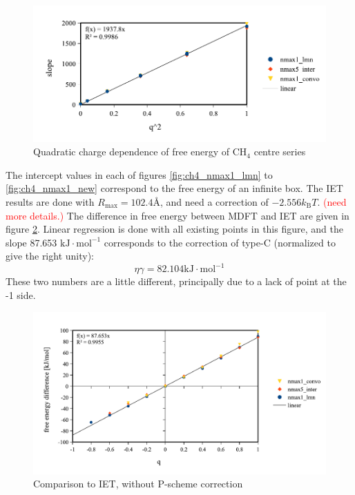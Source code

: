 \begin{figure}[H]
\begin{centering}
\includegraphics[bb=0bp 20bp 425bp 178bp,scale=0.6]{_figure/results/ch4_slope}
\par\end{centering}
\caption{Quadratic charge dependence of free energy of $\mathrm{C}\mathrm{H}_{4}$
centre series\label{fig:Quadratic-charge-dependence}}
\end{figure}
The intercept values in each of figures \ref{fig:ch4_nmax1_lmn} to
\ref{fig:ch4_nmax1_new} correspond to the free energy of an infinite
box. The \acs{IET} results are done with $R_{\max}=102.4\textrm{Å}$,
and need a correction of $-2.556k_{\mathrm{B}}T$. \textcolor{red}{(need
more details.)} The difference in free energy between MDFT and IET
are given in figure \ref{fig:Comparison-to-IET,without-correction}.
Linear regression is done with all existing points in this figure, and the slope 87.653 $\mathrm{kJ}\cdot\mathrm{mol^{-1}}$ corresponds
to the correction of type-C (normalized to give the right unity):
\begin{equation}
\eta\gamma=82.104\mathrm{kJ}\cdot\mathrm{mol^{-1}}\label{eq:eta-gamma}
\end{equation}
These two numbers are a little different, principally due to a lack
of point at the -1 side.

\begin{figure}[h]
\begin{centering}
\includegraphics[bb=0bp 20bp 510bp 263bp,scale=0.6]{_figure/results/ch4_diff_energy}
\par\end{centering}
\caption{Comparison to IET, without P-scheme correction\label{fig:Comparison-to-IET,without-correction}}
\end{figure}


